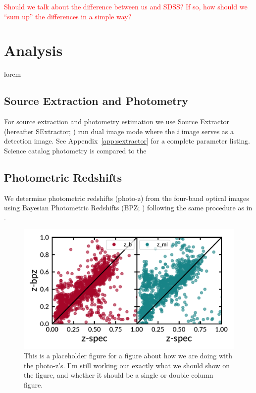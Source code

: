 \documentclass[apj, revtex4]{emulateapj}
\newcommand{\editorial}[1]{\textcolor{red}{#1}}
\begin{document}
\editorial{Should we talk about the difference between us and SDSS? If so, how should we ``sum up'' the differences in a simple way?} 

\section{Analysis}\label{sec:analysis}
lorem

\subsection{Source Extraction and Photometry}
For source extraction and photometry estimation we use Source Extractor (hereafter SExtractor; \citealt{Bertin1996}) run dual image mode where the $i$ image serves as a detection image. See Appendix~\ref{app:sextractor} for a complete parameter listing. Science catalog photometry is compared to the 

\subsection{Photometric Redshifts}
We determine photometric redshifts (photo-z) from the four-band optical images using Bayesian Photometric Redshifts (BPZ; \citealt{Benitez2000, Coe2006}) following the same procedure as in \cite{Menanteau2008a}.

\begin{figure} 
	\includegraphics[width=\textwidth]{figures/specVSphot.pdf} 
	\caption{This is a placeholder figure for a figure about how we are doing with the photo-z's. I'm still working out exactly what we should show on the figure, and whether it should be a single or double column figure.} 
	\label{fig:icd_vs_mass} 
\end{figure}
\end{document}
